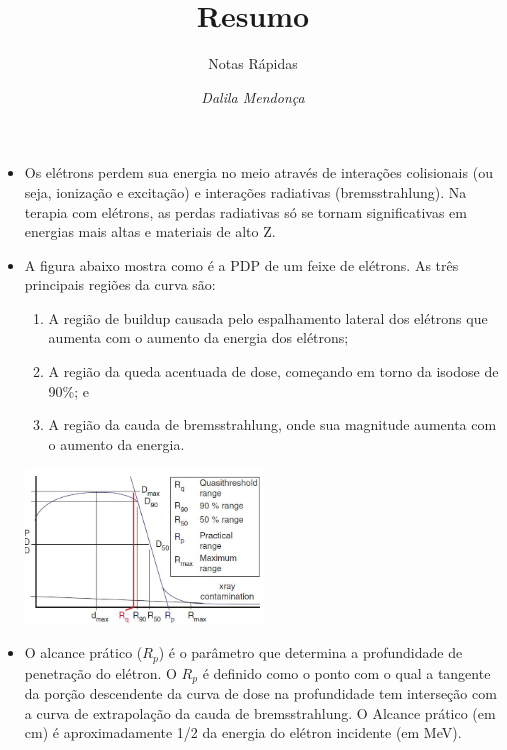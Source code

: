 \documentclass[11pt,a4paper]{article}
\title{Resumo}
\author{Notas Rápidas \nocite{*}}
\date{\textit{Dalila Mendonça}}
\newcounter{exemplo}
\begin{document}
	\maketitle


\begin{exemplo}
    \begin{itemize}
        \item Os elétrons perdem sua energia no meio através de interações colisionais (ou seja, ionização e excitação) e interações radiativas (bremsstrahlung). Na terapia com elétrons, as perdas radiativas só se tornam significativas em energias mais altas e materiais de alto Z.
        
        \item A figura abaixo mostra como é a PDP de um feixe de elétrons. As três principais regiões da curva são:
        
            \begin{enumerate}[label=label=\textcolor{CarnationPink}{\roman*.}]
                \item A região de buildup causada pelo espalhamento lateral dos elétrons que aumenta com o aumento da energia dos elétrons;
                \item A região da queda acentuada de dose, começando em torno da isodose de 90\%; e 
                \item A região da cauda de bremsstrahlung, onde sua magnitude aumenta com o aumento da energia.
            \end{enumerate}
        
            \begin{center}
                \includegraphics[width=0.5\textwidth]{Imagens/pdpEletrons.JPG}
            \end{center}

        \item O alcance prático ($R_p$) é o parâmetro que determina a profundidade de penetração do elétron. O $R_p$ é definido como o ponto com o qual a tangente da porção descendente da curva de dose na profundidade tem interseção com a curva de extrapolação da cauda de bremsstrahlung. O Alcance prático (em cm) é aproximadamente 1/2 da energia do elétron incidente (em MeV).
        

\end{itemize}
\end{exemplo}
\end{document}
